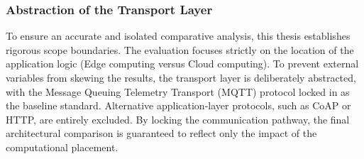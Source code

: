 \subsubsection{Abstraction of the Transport Layer}

To ensure an accurate and isolated comparative analysis, this thesis establishes rigorous scope boundaries. The evaluation focuses strictly on the location of the application logic (Edge computing versus Cloud computing). To prevent external variables from skewing the results, the transport layer is deliberately abstracted, with the Message Queuing Telemetry Transport (MQTT) protocol locked in as the baseline standard. Alternative application-layer protocols, such as CoAP or HTTP, are entirely excluded. By locking the communication pathway, the final architectural comparison is guaranteed to reflect only the impact of the computational placement.
